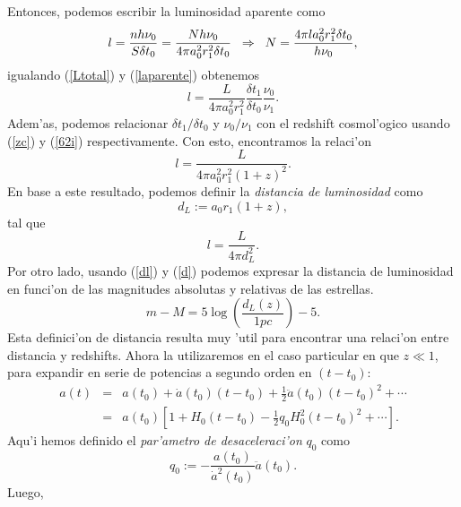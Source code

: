 Entonces, podemos escribir la luminosidad aparente como
\begin{equation}
 l=\frac{nh\nu_{0}}{S\delta t_{0}} =\frac{Nh\nu_{0}}{4\pi a_{0}^2r_{1}^2\delta t_{0}}  \hspace{0.2cm} \Rightarrow \hspace{0.2cm} N=\frac{4\pi l a_{0}^2r_{1}^2\delta t_{0}}{h\nu_{0}},\label{laparente} 
\end{equation}
igualando (\ref{Ltotal}) y (\ref{laparente}) obtenemos
\begin{equation}
l=\frac{L}{4\pi a_{0}^2 r_{1}^2}\frac{\delta t_{1}}{\delta t_{0}}\frac{\nu_{0}}{\nu_{1}}.
\end{equation}
Adem'as, podemos relacionar $\delta t_{1}/\delta t_{0}$ y $\nu_{0}/\nu_{1}$ con el redshift cosmol'ogico usando (\ref{zc}) y (\ref{62i})
respectivamente. Con esto, encontramos la relaci'on
\begin{equation}
l =\frac{L}{4\pi a_{0}^2 r_{1}^2 (1+z)^2}.
\end{equation}
En base a este resultado, podemos definir la \textit{distancia de luminosidad} como
\begin{equation}
d_{L} :=  a_{0} r_{1} (1+z), \label{dl}
\end{equation}
tal que 
\begin{equation}
l=\frac{L}{4\pi d_{L}^2}.
\end{equation}
Por otro lado, usando (\ref{dl}) y (\ref{d}) podemos expresar la distancia de luminosidad en funci'on de las magnitudes absolutas y relativas de las estrellas.
\begin{equation}
m-M = 5\log\left(\frac{d_L(z)}{1pc}\right) - 5. \label{m-M}
\end{equation}
Esta definici'on de distancia resulta muy 'util para encontrar una relaci'on entre distancia y redshifts. Ahora la utilizaremos
en el caso particular en que $z\ll1$, para expandir en serie de potencias a segundo orden en $(t-t_{0})$:\\
\begin{eqnarray}
 a(t)&=&a(t_0)+\dot{a}(t_0)(t-t_0)+\frac{1}{2}\ddot{a}(t_0)(t-t_0)^2+\cdots \\
&=& a(t_0)\left[1+H_0(t-t_0)-\frac{1}{2}q_0H_0^2(t-t_0)^2+\cdots\right]. 
\end{eqnarray}
Aqu'i hemos definido el \textit{par'ametro de desaceleraci'on} $q_0$ como 
\begin{equation}
q_0:=-\frac{a(t_0)}{\dot{a}^2(t_0)}\ddot{a}(t_0).\label{q0}
\end{equation}
Luego,
